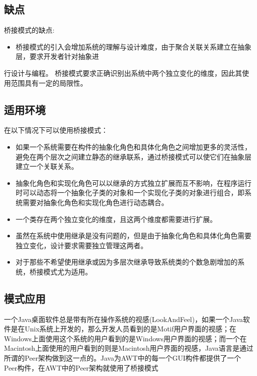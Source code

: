 \documentclass[letterpaper,10pt,english]{sphinxmanual}
\begin{document}
\subsection{缺点}
\label{\detokenize{structural_patterns/bridge:id11}}
\sphinxAtStartPar
桥接模式的缺点:
\begin{itemize}
\item {} 
\sphinxAtStartPar
桥接模式的引入会增加系统的理解与设计难度，由于聚合关联关系建立在抽象层，要求开发者针对抽象进

\end{itemize}

\sphinxAtStartPar
行设计与编程。
\sphinxhyphen{} 桥接模式要求正确识别出系统中两个独立变化的维度，因此其使用范围具有一定的局限性。


\subsection{适用环境}
\label{\detokenize{structural_patterns/bridge:id12}}
\sphinxAtStartPar
在以下情况下可以使用桥接模式：
\begin{itemize}
\item {} 
\sphinxAtStartPar
如果一个系统需要在构件的抽象化角色和具体化角色之间增加更多的灵活性，避免在两个层次之间建立静态的继承联系，通过桥接模式可以使它们在抽象层建立一个关联关系。

\item {} 
\sphinxAtStartPar
抽象化角色和实现化角色可以以继承的方式独立扩展而互不影响，在程序运行时可以动态将一个抽象化子类的对象和一个实现化子类的对象进行组合，即系统需要对抽象化角色和实现化角色进行动态耦合。

\item {} 
\sphinxAtStartPar
一个类存在两个独立变化的维度，且这两个维度都需要进行扩展。

\item {} 
\sphinxAtStartPar
虽然在系统中使用继承是没有问题的，但是由于抽象化角色和具体化角色需要独立变化，设计要求需要独立管理这两者。

\item {} 
\sphinxAtStartPar
对于那些不希望使用继承或因为多层次继承导致系统类的个数急剧增加的系统，桥接模式尤为适用。

\end{itemize}


\subsection{模式应用}
\label{\detokenize{structural_patterns/bridge:id13}}
\sphinxAtStartPar
一个Java桌面软件总是带有所在操作系统的视感(LookAndFeel)，如果一个Java软件是在Unix系统上开发的，那么开发人员看到的是Motif用户界面的视感；在Windows上面使用这个系统的用户看到的是Windows用户界面的视感；而一个在Macintosh上面使用的用户看到的则是Macintosh用户界面的视感，Java语言是通过所谓的Peer架构做到这一点的。Java为AWT中的每一个GUI构件都提供了一个Peer构件，在AWT中的Peer架构就使用了桥接模式
\end{document}
